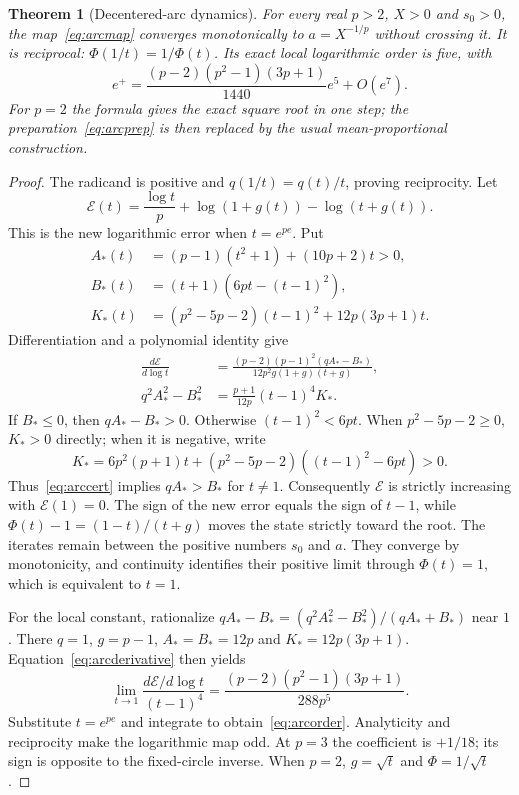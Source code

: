 \documentclass[11pt,a4paper]{article}
\newtheorem{theorem}{Theorem}[section]
\theoremstyle{remark}\newtheorem{remark}[theorem]{Remark}
\begin{document}
\begin{theorem}[Decentered-arc dynamics]\label{thm:arc}
For every real $p>2$, $X>0$ and $s_0>0$, the map~\eqref{eq:arcmap} converges monotonically to $a=X^{-1/p}$ without crossing it. It is reciprocal: $\Phi(1/t)=1/\Phi(t)$. Its exact local logarithmic order is five, with
\begin{equation}\label{eq:arcorder}
 e^+=\frac{(p-2)(p^2-1)(3p+1)}{1440}e^5+O(e^7).
\end{equation}
For $p=2$ the formula gives the exact square root in one step; the preparation~\eqref{eq:arcprep} is then replaced by the usual mean-proportional construction.
\end{theorem}
\begin{proof}
The radicand is positive and $q(1/t)=q(t)/t$, proving reciprocity. Let
\[
 \mathcal E(t)=\frac{\log t}{p}+\log(1+g(t))-\log(t+g(t)).
\]
This is the new logarithmic error when $t=e^{pe}$. Put
\begin{align*}
 A_*(t)&=(p-1)(t^2+1)+(10p+2)t>0,\\
 B_*(t)&=(t+1)(6pt-(t-1)^2),\\
 K_*(t)&=(p^2-5p-2)(t-1)^2+12p(3p+1)t.
\end{align*}
Differentiation and a polynomial identity give
\begin{align}
 \frac{d\mathcal E}{d\log t}
 &=\frac{(p-2)(p-1)^2(qA_*-B_*)}{12p^2g(1+g)(t+g)},\label{eq:arcderivative}\\
 q^2A_*^2-B_*^2&=\frac{p+1}{12p}(t-1)^4K_* .\label{eq:arccert}
\end{align}
If $B_*\le0$, then $qA_*-B_*>0$. Otherwise $(t-1)^2<6pt$. When $p^2-5p-2\ge0$, $K_*>0$ directly; when it is negative, write
\[
 K_*=6p^2(p+1)t+(p^2-5p-2)((t-1)^2-6pt)>0.
\]
Thus~\eqref{eq:arccert} implies $qA_*>B_*$ for $t\ne1$. Consequently $\mathcal E$ is strictly increasing with $\mathcal E(1)=0$. The sign of the new error equals the sign of $t-1$, while $\Phi(t)-1=(1-t)/(t+g)$ moves the state strictly toward the root. The iterates remain between the positive numbers $s_0$ and $a$. They converge by monotonicity, and continuity identifies their positive limit through $\Phi(t)=1$, which is equivalent to $t=1$.

For the local constant, rationalize $qA_*-B_*=(q^2A_*^2-B_*^2)/(qA_*+B_*)$ near $1$. There $q=1$, $g=p-1$, $A_*=B_*=12p$ and $K_*=12p(3p+1)$. Equation~\eqref{eq:arcderivative} then yields
\[
 \lim_{t\to1}\frac{d\mathcal E/d\log t}{(t-1)^4}
 =\frac{(p-2)(p^2-1)(3p+1)}{288p^5}.
\]
Substitute $t=e^{pe}$ and integrate to obtain~\eqref{eq:arcorder}. Analyticity and reciprocity make the logarithmic map odd. At $p=3$ the coefficient is $+1/18$; its sign is opposite to the fixed-circle inverse. When $p=2$, $g=\sqrt t$ and $\Phi=1/\sqrt t$.
\end{proof}
\end{document}
